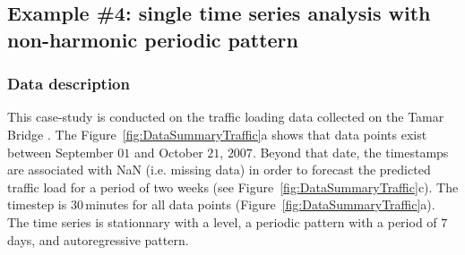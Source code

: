 \subsection{Example \#4: single time series analysis with non-harmonic periodic pattern}
\label{S:Example_TRAFFIC}
\subsubsection{Data description}

This case-study is conducted on the traffic loading data collected on the Tamar Bridge \citep{Goulet2017BDLMEmprical,Nguyen2019KRBDLM}. 
The Figure~\ref{fig:DataSummaryTraffic}a shows that data points exist between  September $01$ and October $21$, $2007$. Beyond that date, the timestamps are associated with NaN (i.e. missing data) in order to forecast the predicted traffic load for a period of two weeks (see Figure~\ref{fig:DataSummaryTraffic}c).  
The timestep is $30$\,minutes for all data points (Figure~\ref{fig:DataSummaryTraffic}a).
The time series is stationnary with a level, a periodic pattern with a period of $7$\,days, and autoregressive pattern.



